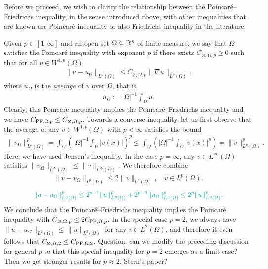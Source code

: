 \documentclass[a4paper]{amsart}
\begin{document}
\begin{remark}
    Before we proceed, we wish to clarify the relationship between the Poincar\'e--Friedrichs inequality, in the sense introduced above, with other inequalities that are known are Poincar\'e inequality or also Friedrichs inequality in the literature. 
    
    Given $p \in [1,\infty]$ and an open set $\Omega \subseteq {\mathbb R}^{n}$ of finite measure, 
    we say that $\Omega$ satisfies the Poincar\'e inequality with exponent $p$ 
    if there exists $C_{{\varnothing},\Omega,p} \geq 0$ such that 
    for all $u \in W^{1,p}(\Omega)$
    \begin{align}
        \| u - u_{\Omega} \|_{L^{p}(\Omega)}
        \leq 
        C_{\varnothing,\Omega,p} 
        \| \nabla u \|_{L^{p}(\Omega)}
        ,
    \end{align}
    where $u_{\Omega}$ is the \emph{average} of $u$ over $\Omega$, that is,
    \begin{align*}
        u_{\Omega} := |\Omega|^{-1} \int_{\Omega} u.
    \end{align*}
    Clearly, this Poincar\'e inequality implies the Poincar\'e--Friedrichs inequality and we have $C_{{\rm{PF}},\Omega,p} \leq C_{\varnothing,\Omega,p}$. 
    Towards a converse inequality, 
    let us first observe that the average of any $v \in W^{1,p}(\Omega)$ with $p < \infty$ satisfies the bound 
    \begin{align*}
        \| v_\Omega \|_{L^{p}(\Omega)}^{p}
        = 
        \int_{\Omega} \left( |\Omega|^{-1} \int_{\Omega} |v(x)| \right)^{p}
        \leq 
        \int_{\Omega} \left( |\Omega|^{-1} \int_{\Omega} |v(x)|^{p} \right)
        = 
        \| v \|_{L^{p}(\Omega)}^{p}
        .
    \end{align*}
    Here, we have used Jensen's inequality. 
    In the case $p = \infty$, any $v \in L^{\infty}(\Omega)$ satisfies $\| v_\Omega \|_{L^{\infty}(\Omega)} \leq \| v \|_{L^{\infty}(\Omega)}$. 
    We therefore combine 
    \begin{align*}
        \| v - v_\Omega \|_{L^{p}(\Omega)} 
        \leq
        2
        \| v \|_{L^{p}(\Omega)},
        \quad 
        v \in L^{p}(\Omega)
        .
    \end{align*}
    \begin{align*}
        \color{Emerald}
        \| u - u_\Omega \|_{L^{p}(\Omega)}^{p}
        \leq 
        2^{p-1} 
        \| u \|_{L^{p}(\Omega)}^{p}
        +
        2^{p-1} 
        \| u_\Omega \|_{L^{p}(\Omega)}^{p}
        \leq 
        2^{p} 
        \| u \|_{L^{p}(\Omega)}^{p}
        .
    \end{align*}
    We conclude that the Poincar\'e--Friedrichs inequality implies the Poincar\'e inequality with $C_{\varnothing,\Omega,p} \leq 2 C_{{\rm PF},\Omega,p}$. 
    In the special case $p=2$, we always have $\| u - u_\Omega \|_{L^{2}(\Omega)} \leq \| u \|_{L^{2}(\Omega)}$ for any $v \in L^{2}(\Omega)$,
    and therefore it even follows that $C_{\varnothing,\Omega,2} \leq C_{{\rm PF},\Omega,2}$. 
    \color{red} Question: can we modify the preceding discussion for general $p$ so that this special inequality for $p=2$ emerges as a limit case? Then we get stronger results for $p \approx 2$. Stern's paper? \color{black}
    

\end{remark}
\end{document}

